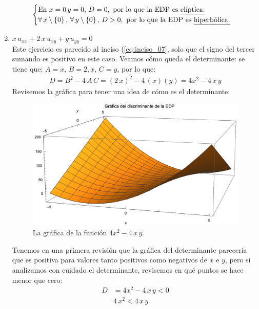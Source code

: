 \begin{enumerate}[label=\alph*)]
\begin{align*}
\begin{cases}
\mbox{En } x = 0 \, y = 0, \, D = 0, \mbox{ por lo que la EDP es \underline{elíptica.}} \\
\forall \, x \setminus \left\{ 0 \right\}, \, \forall \, y  \setminus \left\{ 0 \right\}, \, D > 0, \mbox{ por lo que la EDP es \underline{hiperbólica.}}
\end{cases}
\end{align*}
\item $x \, u_{xx} + 2 \, x \, u_{xy} + y \, u_{yy} = 0$
\\
Este ejercicio es parecido al inciso (\ref{eq:inciso_07}, solo que el signo del tercer sumando es positivo en este caso. Veamos cómo queda el determinante: se tiene que: $A =  x$, $B = 2 , x$, $C = y$, por lo que:
\begin{align*}
D = B^{2} - 4 \, A \, C = (2 \, x)^{2} - 4 \, (x) (y) = 4 x^{2} - 4 \, x \, y
\end{align*}
Revisemos la gráfica para tener una idea de cómo es el determinante:
\begin{figure}[H]
    \centering
    \includegraphics[scale=0.85]{Imagenes/Ejercicio_Plot_05.eps}
    \caption{La gráfica de la función $4 x^{2} - 4 \, x \, y$.}
    \label{fig:plot_04_4x2-4xy}
\end{figure}
Tenemos en una primera revisión que la gráfica del determinante parecería que es positiva para valores tanto positivos como negativos de $x$ e $y$, pero si analizamos con cuidado el determinante, revisemos en qué puntos se hace menor que cero:
\begin{align*}
D &= 4 x^{2} - 4 \, x \, y < 0 \\[0.5em]
&4 \, x^{2} < 4 \, x \, y \\[0.5em]

\end{align*}
\end{enumerate}
